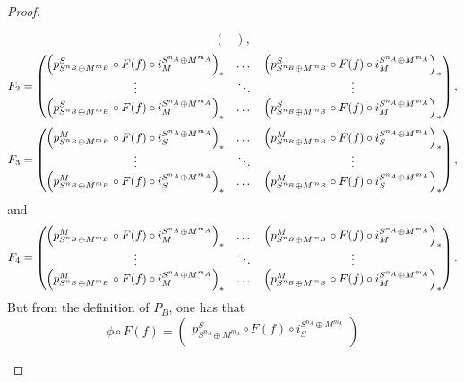 \begin{proof}
\begin{enumerate}
{\[\begin{pmatrix}
                \end{pmatrix},
            \]
            \[
                F_2 = \begin{pmatrix}
                    \left(  p_{S^{n_B} \oplus M^{m_B}}^S \circ F(f) \circ i_M^{S^{n_A} \oplus M^{m_A}}  \right)_* & \dots & \left(  p_{S^{n_B} \oplus M^{m_B}}^S \circ F(f) \circ i_M^{S^{n_A} \oplus M^{m_A}}  \right)_* \\
                    \vdots & \ddots & \vdots \\
                    \left(  p_{S^{n_B} \oplus M^{m_B}}^S \circ F(f) \circ i_M^{S^{n_A} \oplus M^{m_A}}  \right)_* & \dots & \left(  p_{S^{n_B} \oplus M^{m_B}}^S \circ F(f) \circ i_M^{S^{n_A} \oplus M^{m_A}}  \right)_* \\
                \end{pmatrix},
            \]
            \[
                F_3 = \begin{pmatrix}
                    \left(  p_{S^{n_B} \oplus M^{m_B}}^M \circ F(f) \circ i_S^{S^{n_A} \oplus M^{m_A}}  \right)_* & \dots & \left(  p_{S^{n_B} \oplus M^{m_B}}^M \circ F(f) \circ i_S^{S^{n_A} \oplus M^{m_A}}  \right)_* \\
                    \vdots & \ddots & \vdots \\
                    \left(  p_{S^{n_B} \oplus M^{m_B}}^M \circ F(f) \circ i_S^{S^{n_A} \oplus M^{m_A}}  \right)_* & \dots & \left(  p_{S^{n_B} \oplus M^{m_B}}^M \circ F(f) \circ i_S^{S^{n_A} \oplus M^{m_A}}  \right)_* \\
                \end{pmatrix},
            \]
            and
            \[
                F_4 = \begin{pmatrix}
                    \left(  p_{S^{n_B} \oplus M^{m_B}}^M \circ F(f) \circ i_M^{S^{n_A} \oplus M^{m_A}}  \right)_* & \dots & \left(  p_{S^{n_B} \oplus M^{m_B}}^M \circ F(f) \circ i_M^{S^{n_A} \oplus M^{m_A}}  \right)_* \\
                    \vdots & \ddots & \vdots \\
                    \left(  p_{S^{n_B} \oplus M^{m_B}}^M \circ F(f) \circ i_M^{S^{n_A} \oplus M^{m_A}}  \right)_* & \dots & \left(  p_{S^{n_B} \oplus M^{m_B}}^M \circ F(f) \circ i_M^{S^{n_A} \oplus M^{m_A}}  \right)_* \\
                \end{pmatrix}.
            \]
            But from the definition of \( P_B \), one has that
            \[
                \phi \circ F(f) = \begin{pmatrix}
                     p_{S^{n_A} \oplus M^{m_A}}^S \circ F(f) \circ i_S^{S^{n_A} \oplus M^{m_A}} \\

\end{pmatrix}\]}
\end{enumerate}
\end{proof}
